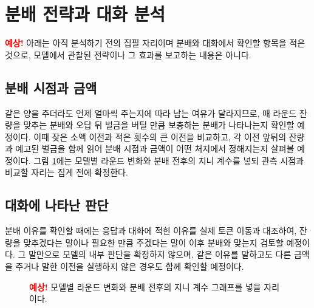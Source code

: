 \section{분배 전략과 대화 분석}\label{sec:strategies}

\noindent\textcolor{red}{\textbf{예상!}} 아래는 아직 분석하기 전의 집필 자리이며 분배와 대화에서 확인할 항목을 적은 것으로, 모델에서 관찰된 전략이나 그 효과를 보고하는 내용은 아니다.

\subsection{분배 시점과 금액}

같은 양을 주더라도 언제 얼마씩 주는지에 따라 남는 여유가 달라지므로, 매 라운드 잔량을 맞추는 분배와 오답 뒤 벌금을 버틸 만큼 보충하는 분배가 나타나는지 확인할 예정이다.
이때 잦은 소액 이전과 적은 횟수의 큰 이전을 비교하고, 각 이전 앞뒤의 잔량과 예고된 벌금을 함께 읽어 분배 시점과 금액이 어떤 처지에서 정해지는지 살펴볼 예정이다.
그림 \ref{fig:arena-gini}에는 모델별 라운드 변화와 분배 전후의 지니 계수를 넣되 관측 시점과 비교할 자리는 집계 전에 확정한다.

\subsection{대화에 나타난 판단}

분배 이유를 확인할 때에는 응답과 대화에 적힌 이유를 실제 토큰 이동과 대조하여, 잔량을 맞추겠다는 말이나 필요한 만큼 주겠다는 말이 이후 분배와 맞는지 검토할 예정이다.
그 말만으로 모델의 내부 판단을 확정하지 않으며, 같은 이유를 말하고도 다른 금액을 주거나 말한 이전을 실행하지 않은 경우도 함께 확인할 예정이다.

\begin{figure}[t]
\centering
\resizebox{\textwidth}{!}{}
\caption{\textcolor{red}{\textbf{예상!}} 모델별 라운드 변화와 분배 전후의 지니 계수 그래프를 넣을 자리이다.}
\label{fig:arena-gini}
\end{figure}
